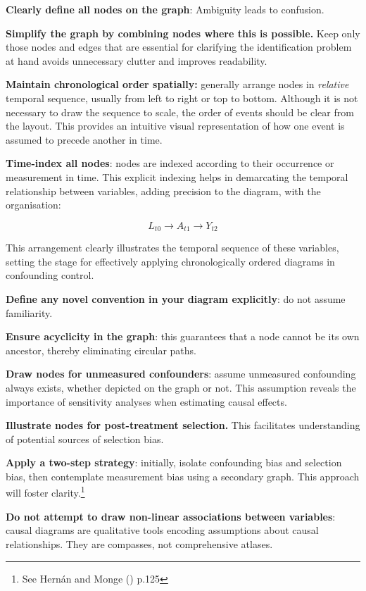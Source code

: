 \documentclass[
  singlecolumn,
  9pt]{article}
\begin{document}
\textbf{Clearly define all nodes on the graph}: Ambiguity leads to
confusion.

\textbf{Simplify the graph by combining nodes where this is possible.}
Keep only those nodes and edges that are essential for clarifying the
identification problem at hand avoids unnecessary clutter and improves
readability.

\textbf{Maintain chronological order spatially:} generally arrange nodes
in \emph{relative} temporal sequence, usually from left to right or top
to bottom. Although it is not necessary to draw the sequence to scale,
the order of events should be clear from the layout. This provides an
intuitive visual representation of how one event is assumed to precede
another in time.

\textbf{Time-index all nodes}: nodes are indexed according to their
occurrence or measurement in time. This explicit indexing helps in
demarcating the temporal relationship between variables, adding
precision to the diagram, with the organisation:

\[L_{t0} \to A_{t1} \to Y_{t2}\]

This arrangement clearly illustrates the temporal sequence of these
variables, setting the stage for effectively applying chronologically
ordered diagrams in confounding control.

\textbf{Define any novel convention in your diagram explicitly}: do not
assume familiarity.

\textbf{Ensure acyclicity in the graph}: this guarantees that a node
cannot be its own ancestor, thereby eliminating circular paths.

\textbf{Draw nodes for unmeasured confounders}: assume unmeasured
confounding always exists, whether depicted on the graph or not. This
assumption reveals the importance of sensitivity analyses when
estimating causal effects.

\textbf{Illustrate nodes for post-treatment selection.} This facilitates
understanding of potential sources of selection bias.

\textbf{Apply a two-step strategy}: initially, isolate confounding bias
and selection bias, then contemplate measurement bias using a secondary
graph. This approach will foster clarity.\footnote{See Hernán and Monge
  () p.125}

\textbf{Do not attempt to draw non-linear associations between
variables}: causal diagrams are qualitative tools encoding assumptions
about causal relationships. They are compasses, not comprehensive
atlases.
\end{document}
